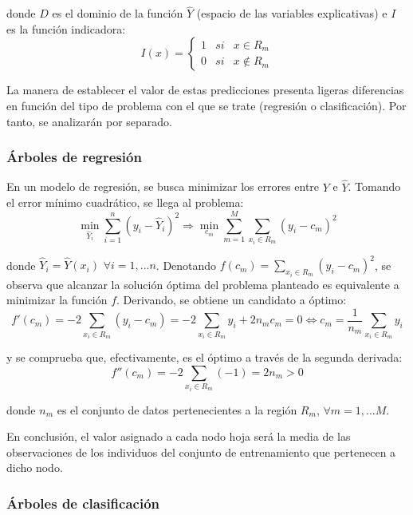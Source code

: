 \documentclass[12pt,twoside]{article}
\begin{document}
\noindent
donde $D$ es el dominio de la función $\hat{Y}$ (espacio de las variables explicativas) e $I$ es la función indicadora:
\begin{equation*}
I(x) = 
\left\{
\begin{array}{ccc}
1 & si & x \in R_m \\
0 & si & x \not\in R_m 
\end{array}
\right.
\end{equation*}

La manera de establecer el valor de estas predicciones presenta ligeras diferencias en función del tipo de problema con el que se trate (regresión o clasificación). Por tanto, se analizarán por separado.


\subsubsection{Árboles de regresión}
En un modelo de regresión, se busca minimizar los errores entre $Y$ e $\hat{Y}$. Tomando el error mínimo cuadrático, se llega al problema:
\begin{equation*}
\min_{\hat{Y}_i} \sum_{i=1}^n (y_i - \hat{Y}_i)^2 \Rightarrow \min_{c_m} \sum_{m = 1}^M \sum_{x_i \in R_m} (y_i - c_m)^2
\end{equation*}

\noindent
donde $\hat{Y}_i = \hat{Y}(x_i) \, \, \forall i=1,...n$. Denotando $f(c_m) = \sum_{x_i \in R_m} (y_i - c_m)^2$, se observa que alcanzar la solución óptima del problema planteado es equivalente a minimizar la función $f$. Derivando, se obtiene un candidato a óptimo:
\begin{equation}
\label{eq:01}
f'(c_m) = -2 \sum_{x_i \in R_m} (y_i - c_m) = -2 \sum_{x_i \in R_m}y_i + 2n_mc_m = 0 \Leftrightarrow c_m = \frac{1}{n_m} \sum_{x_i \in R_m}y_i
\end{equation}

\noindent
y se comprueba que, efectivamente, es el óptimo a través de la segunda derivada:
\begin{equation*}
f''(c_m) = -2 \sum_{x_i \in R_m} (-1) = 2n_m > 0
\end{equation*}

\noindent
donde $n_m$ es el conjunto de datos pertenecientes a la región $R_m$, $\forall m = 1,...M$.

En conclusión, el valor asignado a cada nodo hoja será la media de las observaciones de los individuos del conjunto de entrenamiento que pertenecen a dicho nodo.


\subsubsection{Árboles de clasificación}
\end{document}
